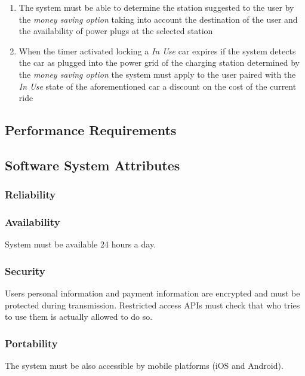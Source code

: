 \begin{description}
\begin{enumerate}[resume*]
  				\item The system must be able to determine the station suggested to the user by the
  				\emph{money saving option} taking into account the destination of the user and
  				the availability of power plugs at the selected station
  				\item When the timer activated locking a \emph{In Use} car expires if the system
  				detects the car as plugged into the power grid of the charging station determined by
  				the \emph{money saving option} the system must apply to the user paired with the
  				\emph{In Use} state of the aforementioned car a discount on the cost of
  				the current ride		
   			\end{enumerate}
  	\end{description}
  	
\subsection{Performance Requirements}
\subsection{Software System Attributes}
	\subsubsection{Reliability}
	\subsubsection{Availability}
	System must be available 24 hours a day.
	\subsubsection{Security}
	Users personal information and payment information are encrypted and must be protected during transmission.
	Restricted access APIs must check that who tries to use them is actually allowed to do so.
	\subsubsection{Portability}
	The system must be also accessible by mobile platforms (iOS and Android).

